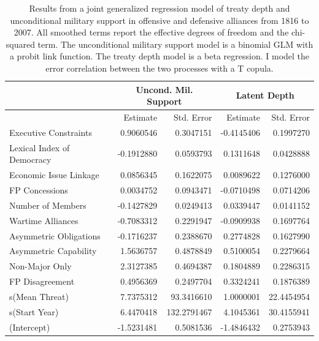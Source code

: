 \documentclass[12pt]{article}
\begin{document}
\begin{table}[ht]
\centering
\begin{tabular}{lrrrr}
  & \multicolumn{2}{c}{Uncond. Mil. Support} & \multicolumn{2}{c}{Latent Depth}\\ \hline
  & Estimate & Std. Error & Estimate & Std. Error \\ 
  \hline
  Executive Constraints & 0.9060546 & 0.3047151 & -0.4145406 & 0.1997270 \\ 
  Lexical Index of Democracy & -0.1912880 & 0.0593793 & 0.1311648 & 0.0428888 \\ 
  Economic Issue Linkage & 0.0856345 & 0.1622075 & 0.0089622 & 0.1276000 \\ 
  FP Concessions & 0.0034752 & 0.0943471 & -0.0710498 & 0.0714206 \\ 
  Number of Members & -0.1427829 & 0.0249413 & 0.0339447 & 0.0141152 \\ 
  Wartime Alliances & -0.7083312 & 0.2291947 & -0.0909938 & 0.1697764 \\ 
  Asymmetric Obligations & -0.1716237 & 0.2388670 & 0.2774828 & 0.1627990 \\ 
  Asymmetric Capability & 1.5636757 & 0.4878849 & 0.5100054 & 0.2279664 \\ 
  Non-Major Only & 2.3127385 & 0.4694387 & 0.1804889 & 0.2286315 \\ 
  FP Disagreement & 0.4956369 & 0.2497704 & 0.3324241 & 0.1876389 \\ 
  s(Mean Threat) & 7.7375312 & 93.3416610 & 1.0000001 & 22.4454954 \\ 
  s(Start Year) & 6.4470418 & 132.2791467 & 4.1045361 & 30.4155941 \\ 
  (Intercept) & -1.5231481 & 0.5081536 & -1.4846432 & 0.2753943 \\ 
   \hline
\end{tabular}
\caption{Results from a joint generalized regression model of treaty depth and unconditional military support in 
         offensive and defensive alliances from 1816 to 2007. 
                     All smoothed terms report the effective degrees of freedom and the chi-squared term. 
                     The unconditional military support model is a binomial GLM with a probit link function. 
                     The treaty depth model is a beta regression. 
                     I model the error correlation between the two processes with a T copula.} 
\label{tab:gjrm-res}
\end{table}
\end{document}

